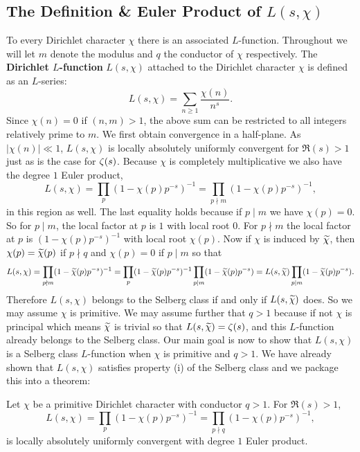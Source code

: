     \subsection*{The Definition \& Euler Product of \texorpdfstring{$L(s,\chi)$}{L(s,\chi)}}
      To every Dirichlet character $\chi$ there is an associated $L$-function. Throughout we will let $m$ denote the modulus and $q$ the conductor of $\chi$ respectively. The \textbf{Dirichlet $L$-function} $L(s,\chi)$ attached to the Dirichlet character $\chi$ is defined as an $L$-series:
      \[
        L(s,\chi) = \sum_{n \ge 1}\frac{\chi(n)}{n^{s}}.
      \]
      Since $\chi(n) = 0$ if $(n,m) > 1$, the above sum can be restricted to all integers relatively prime to $m$. We first obtain convergence in a half-plane. As $|\chi(n)| \ll 1$, $L(s,\chi)$ is locally absolutely uniformly convergent for $\Re(s) > 1$ just as is the case for $\zeta(s)$. Because $\chi$ is completely multiplicative we also have the degree $1$ Euler product,
      \[
        L(s,\chi) = \prod_{p}(1-\chi(p)p^{-s})^{-1} = \prod_{p \nmid m}(1-\chi(p)p^{-s})^{-1},
      \]
      in this region as well. The last equality holds because if $p \mid m$ we have $\chi(p) = 0$. So for $p \mid m$, the local factor at $p$ is $1$ with local root $0$. For $p \nmid m$ the local factor at $p$ is $(1-\chi(p)p^{-s})^{-1}$ with local root $\chi(p)$. Now if $\chi$ is induced by $\widetilde{\chi}$, then $\chi(p) = \widetilde{\chi}(p)$ if $p \nmid q$ and $\chi(p) = 0$ if $p \mid m$ so that
      \begin{equation}\label{equ:non-primitive_primitive_Dirichlet_L-series_relation}
        L(s,\chi) = \prod_{p \nmid m}(1-\widetilde{\chi}(p)p^{-s})^{-1} = \prod_{p}(1-\widetilde{\chi}(p)p^{-s})^{-1}\prod_{p \mid m}(1-\widetilde{\chi}(p)p^{-s}) = L(s,\widetilde{\chi})\prod_{p \mid m}(1-\widetilde{\chi}(p)p^{-s}).
      \end{equation}
      Therefore $L(s,\chi)$ belongs to the Selberg class if and only if $L(s,\widetilde{\chi})$ does. So we may assume $\chi$ is primitive. We may assume further that $q > 1$ because if not $\chi$ is principal which means $\widetilde{\chi}$ is trivial so that $L(s,\widetilde{\chi}) = \zeta(s)$, and this $L$-function already belongs to the Selberg class. Our main goal is now to show that $L(s,\chi)$ is a Selberg class $L$-function when $\chi$ is primitive and $q > 1$. We have already shown that $L(s,\chi)$ satisfies property (i) of the Selberg class and we package this into a theorem:

      \begin{theorem}
        Let $\chi$ be a primitive Dirichlet character with conductor $q > 1$. For $\Re(s) > 1$,
        \[
          L(s,\chi) = \prod_{p}(1-\chi(p)p^{-s})^{-1} = \prod_{p \nmid q}(1-\chi(p)p^{-s})^{-1},
        \]
        is locally absolutely uniformly convergent with degree $1$ Euler product.
      \end{theorem}
